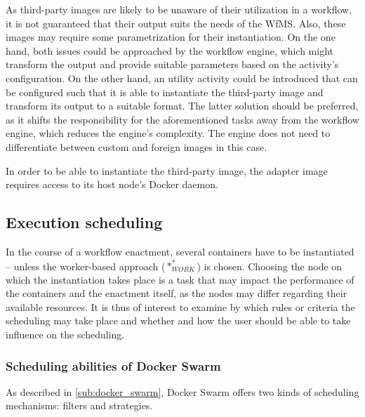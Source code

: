   As third-party images are likely to be unaware of their utilization in a workflow, it is not guaranteed that their output suits the needs of the \ac{WfMS}. Also, these images may require some parametrization for their instantiation. On the one hand, both issues could be approached by the workflow engine, which might transform the output and provide suitable parameters based on the activity's configuration. On the other hand, an utility activity could be introduced that can be configured such that it is able to instantiate the third-party image and transform its output to a suitable format.
  The latter solution should be preferred, as it shifts the responsibility for the aforementioned tasks away from the workflow engine, which reduces the engine's complexity. The engine does not need to differentiate between custom and foreign images in this case.

  In order to be able to instantiate the third-party image, the adapter image requires access to its host node's Docker daemon.


\subsection{Execution scheduling} %
\label{sub:execution_scheduling}
  In the course of a workflow enactment, several containers have to be instantiated -- unless the worker-based approach ($*_{WORK}^{*}$) is chosen. Choosing the node on which the instantiation takes place is a task that may impact the performance of the containers and the enactment itself, as the nodes may differ regarding their available resources. It is thus of interest to examine by which rules or criteria the scheduling may take place and whether and how the user should be able to take influence on the scheduling.

  \subsubsection{Scheduling abilities of Docker Swarm} %
    \label{ssub:abilities_of_docker_swarm}
    As described in \ref{sub:docker_swarm}, Docker Swarm offers two kinds of scheduling mechanisms: filters and strategies.

